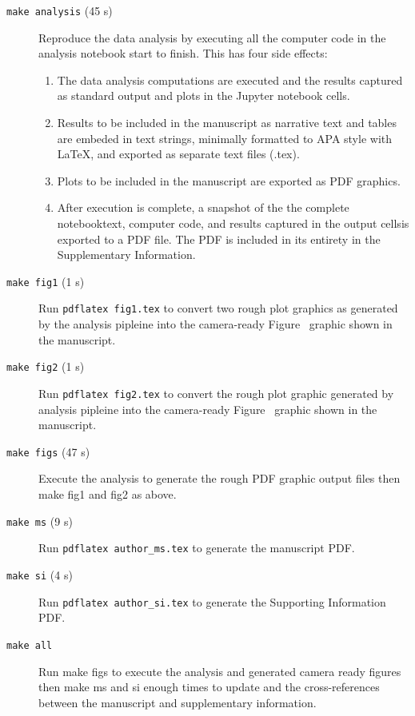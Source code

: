 \documentclass[helv,10pt,man,floatsintext]{apa6}  %
\begin{document}
\begin{description}

\item [\texttt{make analysis} (45 s)] Reproduce the data analysis by
  executing all the computer code in the analysis notebook start to
  finish. This has four side effects:

\begin{enumerate}
  \item The data analysis computations are executed and the results captured
    as standard output and plots in the Jupyter notebook cells. 
  \item Results to be included in the manuscript as narrative text and
    tables are embeded in text strings, minimally formatted to APA
    style with \LaTeX{}, and exported as separate text files (.tex).
  \item Plots to be included in the manuscript are exported as PDF graphics.
  \item After execution is complete, a snapshot of the the complete
    notebook\textemdash text, computer code, and results captured in
    the output cells\textemdash is exported to a PDF file. The PDF is
    included in its entirety in the Supplementary Information.
\end{enumerate}  

\item [\texttt{make fig1} (1 s)] Run
  \texttt{pdflatex fig1.tex} to convert two rough plot
  graphics as generated by the analysis pipleine into the camera-ready
  Figure~ graphic shown in the manuscript.

\item [\texttt{make fig2} (1 s)] Run \texttt{pdflatex fig2.tex}
  to convert the rough plot graphic generated by analysis
  pipleine into the camera-ready Figure~ graphic shown in the
  manuscript.

\item [\texttt{make figs} (47 s)] Execute the analysis to generate the rough PDF graphic
  output files then make fig1 and fig2 as above. 

\item [\texttt{make ms} (9 s)] Run \texttt{pdflatex author_ms.tex}
  to generate the manuscript PDF.

\item [\texttt{make si} (4 s)] Run \texttt{pdflatex author_si.tex}
   to generate the Supporting Information PDF.

\item [\texttt{make all}] Run make figs to execute the
  analysis and generated camera ready figures then make ms and si
  enough times to update and the cross-references between the
  manuscript and supplementary information.

\end{description}
\end{document}
